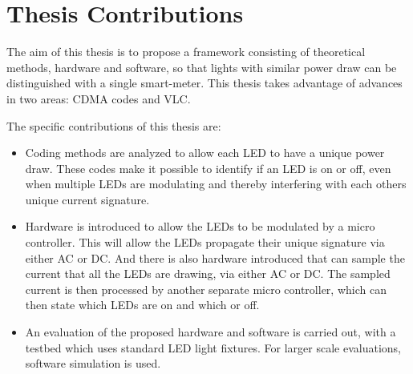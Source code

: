 

\section{Thesis Contributions}

The aim of this thesis is to propose a framework consisting of theoretical methods, hardware and software, so that lights with similar power draw can be distinguished with a single smart-meter.
This thesis takes advantage of advances in two areas: CDMA codes and VLC.

The specific contributions of this thesis are:

\begin{itemize}

	\item Coding methods are analyzed to allow each LED to have a unique power draw. 
	These codes make it possible to identify if an LED is on or off, even when multiple LEDs are modulating and thereby interfering with each others unique current signature.




	\item Hardware is introduced to allow the LEDs to be modulated by a micro controller. 
	This will allow the LEDs propagate their unique signature via either AC or DC. 
	And there is also hardware introduced that can sample the current that all the LEDs are drawing, via either AC or DC.
	The sampled current is then processed by another separate micro controller, which can then state which LEDs are on and which or off.




	\item An evaluation of the proposed hardware and software is carried out, with a testbed which uses standard LED light fixtures. For larger scale evaluations, software simulation is used. 
\end{itemize}
